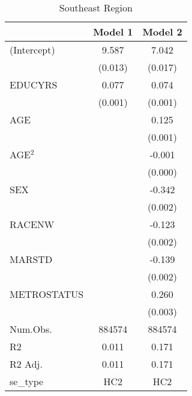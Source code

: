 \documentclass[12pt, English]{article}
\begin{document}
\begin{table}
\centering %
    \caption{Southeast Region}
    \vspace{7.5mm} %
\begin{tabular}[t]{lcc}
\toprule
  & Model 1 & Model 2\\
\midrule
(Intercept) & 9.587 & 7.042\\
 & (0.013) & (0.017)\\
EDUCYRS & 0.077 & 0.074\\
 & (0.001) & (0.001)\\
AGE &  & 0.125\\
 &  & (0.001)\\
AGE$^2$ &  & -0.001\\
 &  & (0.000)\\
SEX &  & -0.342\\
 &  & \vphantom{2} (0.002)\\
RACENW &  & -0.123\\
 &  & \vphantom{1} (0.002)\\
MARSTD &  & -0.139\\
 &  & (0.002)\\
METROSTATUS &  & 0.260\\
 &  & (0.003)\\
\midrule
Num.Obs. & 884574 & 884574\\
R2 & 0.011 & 0.171\\
R2 Adj. & 0.011 & 0.171\\
se\_type & HC2 & HC2\\
\bottomrule
\end{tabular}
\end{table}

\newpage
\end{document}
